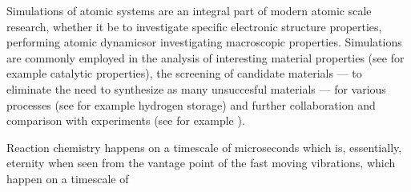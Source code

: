 Simulations of atomic systems are an integral part of modern atomic scale research, whether it be to investigate specific electronic structure properties\citemiss, performing atomic dynamics\citemiss or investigating macroscopic properties\citemiss.
Simulations are commonly employed in the analysis of interesting material properties (see for example catalytic properties\citemiss), the screening of candidate materials --- to eliminate the need to synthesize as many unsuccesful materials --- for various processes (see for example hydrogen storage\citemiss) and further collaboration and comparison with experiments (see for example \citemiss).

Reaction chemistry happens on a timescale of microseconds which is, essentially, eternity when seen from the vantage point of the fast moving vibrations, which happen on a timescale of 





\placeholder
